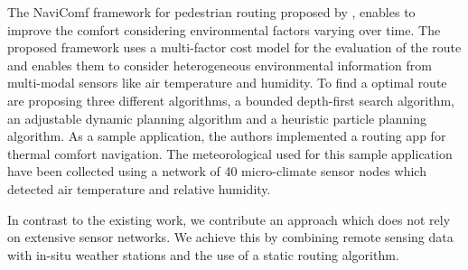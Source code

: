 The NaviComf framework for pedestrian routing proposed by \textcite{Dang2013}, enables to improve the comfort considering environmental factors varying over time. The proposed framework uses a multi-factor cost model for the evaluation of the route and enables them to consider heterogeneous environmental information from multi-modal
 sensors like air temperature and humidity. To find a optimal route \textcite{Dang2013} are proposing three different algorithms,  a bounded depth-first search algorithm, an adjustable dynamic planning algorithm and a heuristic particle planning algorithm. As a sample application, the authors implemented a routing app for thermal comfort navigation. The meteorological used for this sample application have been collected using a network of 40 micro-climate sensor nodes which detected air temperature and relative humidity. 

In contrast to the existing work, we contribute an approach which does not rely on extensive sensor networks. We achieve this by combining remote sensing data with in-situ weather stations and the use of a static routing algorithm.